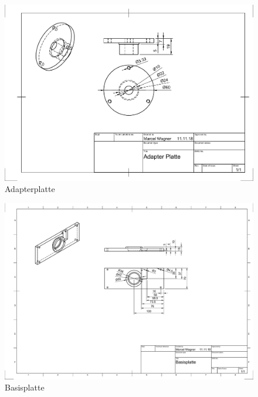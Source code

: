 \begin{figure}
	\centering
	\includegraphics[angle=90,origin=c, width=\textwidth]{images/Mechanik/Adapterplatte}
	\caption{Adapterplatte}
\end{figure}
\begin{figure}
	\centering
	\includegraphics[angle=90,origin=c, width=\textwidth]{images/Mechanik/Basisplatte}
	\caption{Basisplatte}
\end{figure}



